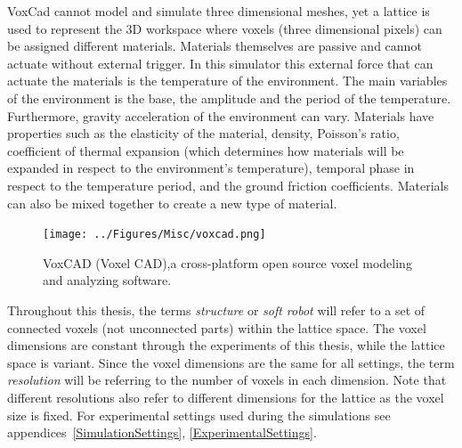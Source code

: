 VoxCad cannot model and simulate three dimensional meshes, yet a lattice is used to represent the 3D workspace where voxels (three dimensional pixels) can be assigned different materials. Materials themselves are passive and cannot actuate without external trigger. In this simulator this external force that can actuate the materials is the temperature of the environment. The main variables of the environment is the base, the amplitude and the period of the temperature. Furthermore, gravity acceleration of the environment can vary. Materials have properties such as the elasticity of the material, density, Poisson's ratio, coefficient of thermal expansion (which determines how materials will be expanded in respect to the environment's temperature), temporal phase in respect to the temperature period, and the ground friction coefficients. Materials can also be mixed together to create a new type of material.

\begin{figure}[t!]
\centering
\texttt{[image: ../Figures/Misc/voxcad.png]}
\caption{VoxCAD (Voxel CAD),a cross-platform open source voxel modeling and analyzing software.}
\label{fig:VoxCAD}
\end{figure}

Throughout this thesis, the terms \textit{structure} or \textit{soft robot} will refer to a set of connected voxels (not unconnected parts) within the lattice space. The voxel dimensions are constant through the experiments of this thesis, while the lattice space is variant. Since the voxel dimensions are the same for all settings, the term \textit{resolution} will be referring to the number of voxels in each dimension. Note that different resolutions also refer to different dimensions for the lattice as the voxel size is fixed.  For experimental settings used during the simulations see appendices~\ref{SimulationSettings}, \ref{ExperimentalSettings}. 

